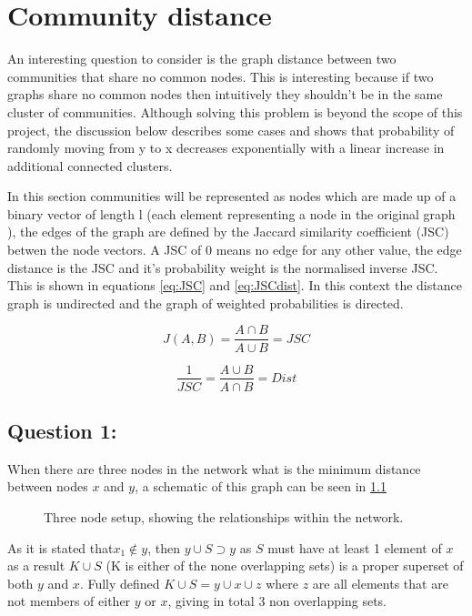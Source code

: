\chapter{Community distance}
\label{community distance}

An interesting question to consider is the graph distance between two communities that share no common nodes. This is interesting because if two graphs share no common nodes then intuitively they shouldn't be in the same cluster of communities. Although solving this problem is beyond the scope of this project, the discussion below describes some cases and shows that probability of randomly moving from y to x decreases exponentially with a linear increase in additional connected clusters.

In this section communities will be represented as nodes which are made up of a binary vector of length l (each element representing a node in the original graph ), the edges of the graph are defined by the Jaccard similarity coefficient (JSC) betwen the node vectors. A JSC of 0 means no edge for any other value, the edge distance is the JSC and it's probability weight is the normalised inverse JSC. This  is shown in equations \ref{eq:JSC} and \ref{eq:JSCdist}. In this context the distance graph is undirected and the graph of weighted probabilities is directed.

\begin{equation}
    J(A,B)=\frac{A\cap B}{A\cup B}=JSC
    \label{eq:JSC}
\end{equation}


\begin{equation}
    \frac{1}{JSC}=\frac{A\cup B}{A\cap B}=Dist
    \label{eq:JSCdist}
\end{equation}


\section{Question 1:} When there are three nodes in the network what is the minimum distance between nodes $x$ and $y$, a schematic of this graph can be seen in \ref{net:threenodes}

\begin{figure}[ht]
    \centering
    
    \caption[Three Node graph]{Three node setup, showing the relationships within the network.}
    \label{net:threenodes}
\end{figure}

As it is stated that$x_1 \notin y$, then $ y\cup S \supset y $ as $S$ must have at least 1 element of $x$ as a result $K \cup S$ (K is either of the none overlapping sets) is a proper superset of both $y$ and $x$. Fully defined $K \cup S = y \cup x \cup z$ where $z$ are all elements that are not members of either $y$ or $x$, giving in total 3 non overlapping sets.

